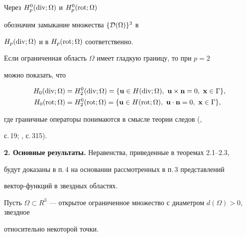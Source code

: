 Через $H_p^0(\operatorname{div};\Omega)$ и $H_p^0(\operatorname{rot};\Omega)$


обозначим замыкание множества $\{{\cal D}(\Omega)\}^3$ в


$H_p(\operatorname{div};\Omega)$ и в $H_p(\operatorname{rot};\Omega)$ соответственно.





\begin{notenonum}


Если ограниченная область $\Omega$ имеет гладкую границу, то при $p=2$ 


можно показать, что


\begin{align*}


H_0(\Div;\Omega)&=H_2^0(\Div;\Omega)=\{\bold{u}\in


H(\Div;\Omega),\ \bold{u}\times\bold{n}=0,\ \bold{x}\in\Gamma\},\\


%


H_0(\Rot;\Omega)&=H_2^0(\Rot;\Omega)=\{\bold{u}\in


H(\Rot;\Omega),\ \bold{u}\cdot\bold{n}=0,\ \bold{x}\in\Gamma\},


\end{align*}


где граничные операторы понимаются в смысле теории следов (\cite{4}, 


с.\,19; \cite{5}, с.\,315).


\end{notenonum}


\addtocounter{section}{1}


\setcounter{equation}{0}


\setcounter{thms}{0}


\setcounter{lems}{0}





{\bf 2. Основные результаты.} Неравенства, приведенные в теоремах 2.1--2.3,


будут доказаны в п.\,4 на основании рассмотренных в п.\,3 представлений


вектор-функций в звездных областях.





Пусть $\Omega\subset


R^3$ --- открытое ограниченное множество с диаметром $d(\Omega)>0$, звездное


относительно некоторой точки.





